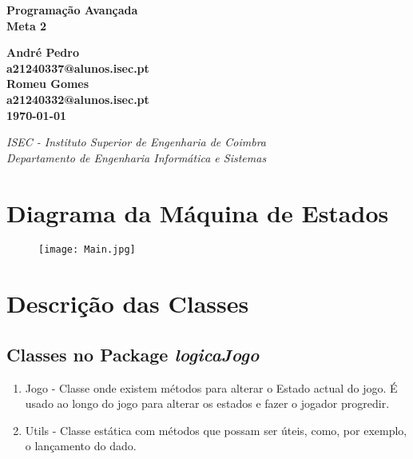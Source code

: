 \documentclass[12pt,a4paper]{article}
\newcommand{\data}{\today}
\begin{document}

\begin{titlepage}
\begin{center}
  \vspace*{1cm}

  {\Huge \textbf{Programação Avançada}} \\
  \vspace{0.8cm}
  \textbf{Meta 2}
  \vspace{0.8cm}

  \vspace{9.0cm}

  \textbf{André Pedro \\ a21240337@alunos.isec.pt}
  \\[0.6cm]
  \textbf{Romeu Gomes \\ a21240332@alunos.isec.pt}
  \\[1cm]
  \textbf{\data{}}

  \vfill
  \textit{ISEC - Instituto Superior de Engenharia de Coimbra\\
  Departamento de Engenharia Informática e Sistemas\\}

\end{center}
\end{titlepage}


\tableofcontents
\newpage\noindent

\section{Diagrama da Máquina de Estados}
\begin{figure}[!ht]
  \centering
    \texttt{[image: Main.jpg]}
\end{figure}

\newpage\noindent

\section{Descrição das Classes}
\subsection{Classes no Package \textit{logicaJogo}}

\begin{enumerate}
\item Jogo - Classe onde existem métodos para alterar o Estado actual do jogo. É usado ao longo do jogo para alterar os estados e fazer o jogador progredir.
\item Utils - Classe estática com métodos que possam ser úteis, como, por exemplo, o lançamento do dado.
\end{enumerate}
\end{document}

